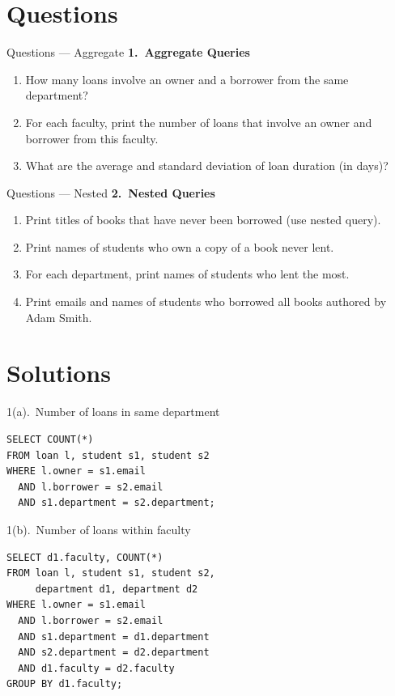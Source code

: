 \documentclass{beamer}
\begin{document}
\section{Questions}
\begin{frame}{Questions — Aggregate}
\footnotesize
\textbf{1.\ Aggregate Queries}
\begin{enumerate}
  \item[(a)] How many loans involve an owner and a borrower from the same department?
  \item[(b)] For each faculty, print the number of loans that involve an owner and borrower from this faculty.
  \item[(c)] What are the average and standard deviation of loan duration (in days)?
\end{enumerate}
\end{frame}

\begin{frame}{Questions — Nested}
\footnotesize
\textbf{2.\ Nested Queries}
\begin{enumerate}
  \item[(a)] Print titles of books that have never been borrowed (use nested query).
  \item[(b)] Print names of students who own a copy of a book never lent.
  \item[(c)] For each department, print names of students who lent the most.
  \item[(d)] Print emails and names of students who borrowed all books authored by Adam Smith.
\end{enumerate}
\end{frame}

\section{Solutions}
\begin{frame}[fragile]{1(a).\ Number of loans in same department}
\begin{lstlisting}
SELECT COUNT(*)
FROM loan l, student s1, student s2
WHERE l.owner = s1.email
  AND l.borrower = s2.email
  AND s1.department = s2.department;
\end{lstlisting}
\end{frame}

\begin{frame}[fragile]{1(b).\ Number of loans within faculty}
\begin{lstlisting}
SELECT d1.faculty, COUNT(*)
FROM loan l, student s1, student s2,
     department d1, department d2
WHERE l.owner = s1.email
  AND l.borrower = s2.email
  AND s1.department = d1.department
  AND s2.department = d2.department
  AND d1.faculty = d2.faculty
GROUP BY d1.faculty;
\end{lstlisting}
\end{frame}
\end{document}
